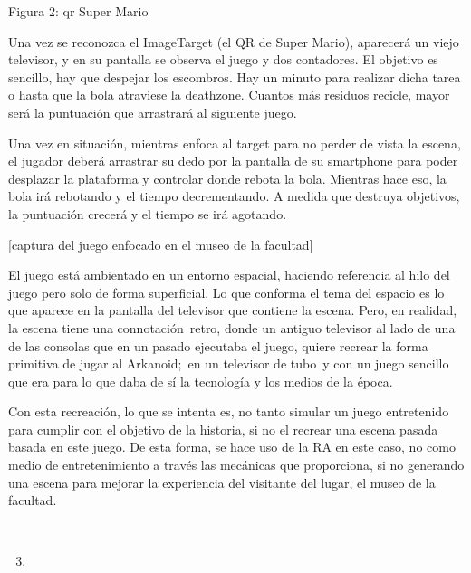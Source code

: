\documentclass[]{article}
\begin{document}
Figura 2: qr Super Mario

Una vez se reconozca el ImageTarget (el QR de Super Mario), aparecerá un
viejo televisor, y en su pantalla se observa el juego y dos contadores.
El objetivo es sencillo, hay que despejar los escombros. Hay un minuto
para realizar dicha tarea o hasta que la bola atraviese la deathzone.
Cuantos más residuos recicle, mayor será la puntuación que arrastrará al
siguiente juego.

Una vez en situación, mientras enfoca al target para no perder de vista
la escena, el jugador deberá arrastrar su dedo por la pantalla de su
smartphone para poder desplazar la plataforma y controlar donde rebota
la bola. Mientras hace eso, la bola irá rebotando y el tiempo
decrementando. A medida que destruya objetivos, la puntuación crecerá y
el tiempo se irá agotando.

{[}captura del juego enfocado en el museo de la facultad{]}

El juego está ambientado en un entorno espacial, haciendo referencia al
hilo del juego pero solo de forma superficial. Lo que conforma el tema
del espacio es lo que aparece en la pantalla del televisor que contiene
la escena. Pero, en realidad, la escena tiene una connotación~retro,
donde un antiguo televisor al lado de una de las consolas que en un
pasado ejecutaba el juego, quiere recrear la forma primitiva de jugar al
Arkanoid;~en un televisor de tubo~y con un juego sencillo que era para
lo que daba de sí la tecnología y los medios de la época.

Con esta recreación, lo que se intenta es, no tanto simular un juego
entretenido para cumplir con el objetivo de la historia, si no el
recrear una escena pasada basada en este juego. De esta forma, se hace
uso de la RA en este caso, no como medio de entretenimiento a través las
mecánicas que proporciona, si no generando una escena para mejorar la
experiencia del visitante del lugar, el museo de la facultad.

~~~~~~~~

\begin{enumerate}
\setcounter{enumi}{2}
\item
\end{enumerate}

\end{document}

